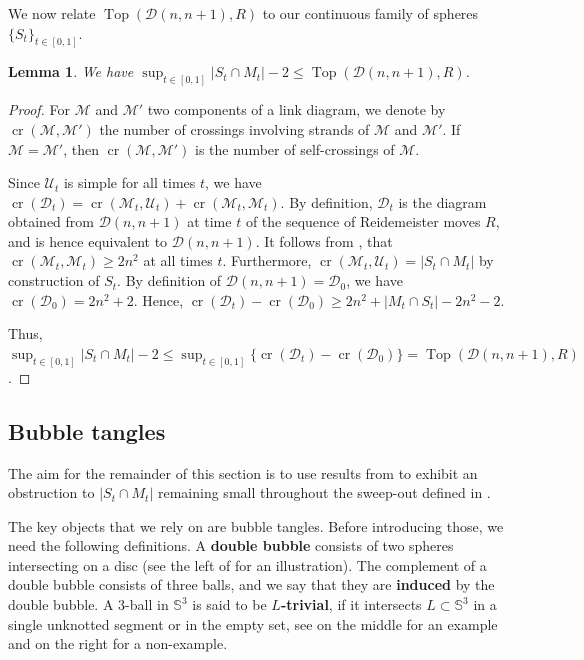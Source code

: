 \documentclass{article}
\newcommand{\Sp}{\mathbb{S}}
\newcommand{\cross}{\operatorname{cr}}
\newcommand{\addcross}{\operatorname{Top}}
\newtheorem{lemma}[theorem]{Lemma}
\begin{document}
We now relate $\addcross(\mathcal{D}(n,n+1),R)$ to our continuous family of spheres $\{S_t\}_{t\in [0,1]}$.

\begin{lemma}\label{lem_inter_sphere}
We have $\sup_{t \in [0,1]} |S_t \cap M_t| -2 \leq \addcross(\mathcal{D}(n,n+1), R)$.
\end{lemma}

\begin{proof}
For $\mathcal{M}$ and $\mathcal{M}'$ two components of a link diagram, we denote by $\cross(\mathcal{M},\mathcal{M}')$ the number of crossings involving strands of $\mathcal{M}$ and $\mathcal{M}'$. If $\mathcal{M} = \mathcal{M}'$, then $\cross(\mathcal{M},\mathcal{M}')$ is the number of self-crossings of $\mathcal{M}$.

Since $\mathcal{U}_t$ is simple for all times $t$, we have $\cross(\mathcal{D}_t) = \cross(\mathcal{M}_t,\mathcal{U}_t) + \cross(\mathcal{M}_t,\mathcal{M}_t)$. By definition, $\mathcal{D}_t$ is the diagram obtained from $\mathcal{D}(n,n+1)$ at time $t$ of the sequence of Reidemeister moves $R$, and is hence equivalent to $\mathcal{D}(n,n+1)$. It follows from , that $\cross(\mathcal{M}_t,\mathcal{M}_t) \geq 2n^2$ at all times $t$. Furthermore, $\cross(\mathcal{M}_t,\mathcal{U}_t) = |S_t \cap M_t|$ by construction of $S_t$. By definition of $\mathcal{D}(n,n+1) = \mathcal{D}_0$, we have $\cross(\mathcal{D}_0)= 2n^2 +2$. Hence, $\cross(\mathcal{D}_t) - \cross(\mathcal{D}_0) \geq 2n^2 + |M_t \cap S_t| - 2n^2 -2 $.

Thus, $\sup_{t \in [0,1]} |S_t \cap M_t| -2 \leq \sup_{t \in [0,1]} \{\cross(\mathcal{D}_t) - \cross(\mathcal{D}_0)\} = \addcross(\mathcal{D}(n,n+1), R)$.
\end{proof}


\subsection{Bubble tangles}
\label{sec:bubbletangles}

The aim for the remainder of this section is to use results from \cite{Lunel_spherewidth_out} to exhibit an obstruction to $|S_t \cap M_t|$ remaining small throughout the sweep-out defined in .

The key objects that we rely on are bubble tangles. Before introducing those, we need the following definitions. A \textbf{double bubble} consists of two spheres intersecting on a disc (see the left of  for an illustration). The complement of a double bubble consists of three balls, and we say that they are \textbf{induced} by the double bubble. A $3$-ball in $\Sp^3$ is said to be \textbf{$L$-trivial}, if it intersects $L \subset \Sp^3$ in a single unknotted segment or in the empty set, see  on the middle for an example and on the right for a non-example.
\end{document}
